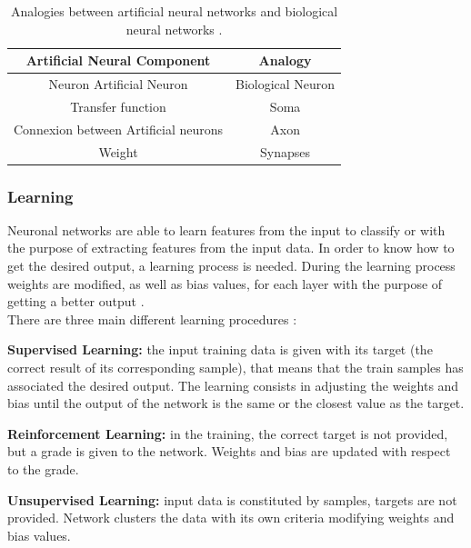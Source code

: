 \begin{table}[htb]
\centering
\begin{tabular}{|c|c|}
\hline
\rowcolor[HTML]{ECF4FF} \textbf{Artificial Neural Component} & \textbf{Analogy}        \\ \hline
Neuron Artificial Neuron                        & Biological Neuron       \\
Transfer function                & Soma \\
Connexion between Artificial neurons               & Axon                     \\
Weight                                     & Synapses                 \\ \hline
\end{tabular}  \caption{Analogies between artificial neural networks and biological neural networks \cite{Analogies}.} \label{table:Analogias}
\end{table}

\subsubsection{Learning}
Neuronal networks are able to learn features from the input to classify or with the purpose of extracting features from the input data. In order to know how to get the desired output, a learning process is needed. During the learning process weights are modified, as well as bias values, for each layer with the purpose of getting a better output \cite{NNDesign}.\\

There are three main different learning procedures \cite{NNDesign,Duda}:
\begin{description}[itemsep=2pt,topsep=8pt,parsep=0pt,partopsep=20pt]
	\item \textbf{Supervised Learning:} the input training data is given with its target (the correct result of its corresponding sample), that means that the train samples has associated the desired output. The learning consists in adjusting the weights and bias until the output of the network is the same or the closest value as the target.
	\item \textbf{Reinforcement Learning:} in the training, the correct target is not provided, but a grade is given to the network. Weights and bias are updated with respect to the grade.
	\item \textbf{Unsupervised Learning:} input data is constituted by samples, targets are not provided. Network clusters the data with its own criteria modifying weights and bias values.
\end{description}

